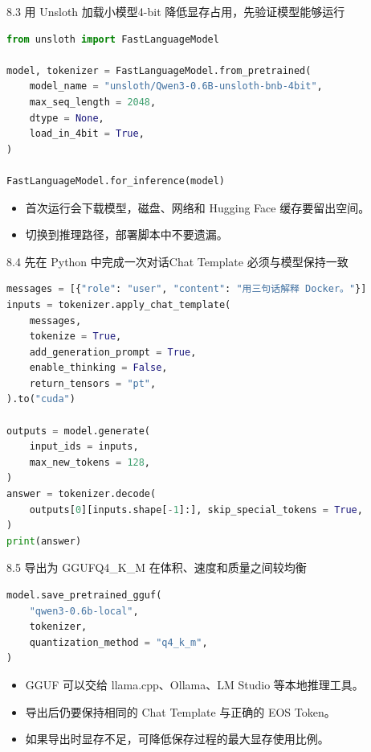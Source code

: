 \begin{frame}[fragile]{8.3 用 Unsloth 加载小模型}{4-bit 降低显存占用，先验证模型能够运行}
  \begin{lstlisting}[language=Python]
from unsloth import FastLanguageModel

model, tokenizer = FastLanguageModel.from_pretrained(
    model_name = "unsloth/Qwen3-0.6B-unsloth-bnb-4bit",
    max_seq_length = 2048,
    dtype = None,
    load_in_4bit = True,
)

FastLanguageModel.for_inference(model)
  \end{lstlisting}
  \begin{itemize}
    \item 首次运行会下载模型，磁盘、网络和 Hugging Face 缓存要留出空间。
    \item {} 切换到推理路径，部署脚本中不要遗漏。
  \end{itemize}
\end{frame}

\begin{frame}[fragile]{8.4 先在 Python 中完成一次对话}{Chat Template 必须与模型保持一致}
  \begin{lstlisting}[language=Python]
messages = [{"role": "user", "content": "用三句话解释 Docker。"}]
inputs = tokenizer.apply_chat_template(
    messages,
    tokenize = True,
    add_generation_prompt = True,
    enable_thinking = False,
    return_tensors = "pt",
).to("cuda")

outputs = model.generate(
    input_ids = inputs,
    max_new_tokens = 128,
)
answer = tokenizer.decode(
    outputs[0][inputs.shape[-1]:], skip_special_tokens = True,
)
print(answer)
  \end{lstlisting}
\end{frame}

\begin{frame}[fragile]{8.5 导出为 GGUF}{Q4\_K\_M 在体积、速度和质量之间较均衡}
  \begin{lstlisting}[language=Python]
model.save_pretrained_gguf(
    "qwen3-0.6b-local",
    tokenizer,
    quantization_method = "q4_k_m",
)
  \end{lstlisting}
  \begin{itemize}
    \item GGUF 可以交给 llama.cpp、Ollama、LM Studio 等本地推理工具。
    \item 导出后仍要保持相同的 Chat Template 与正确的 EOS Token。
    \item 如果导出时显存不足，可降低保存过程的最大显存使用比例。
  \end{itemize}
\end{frame}

